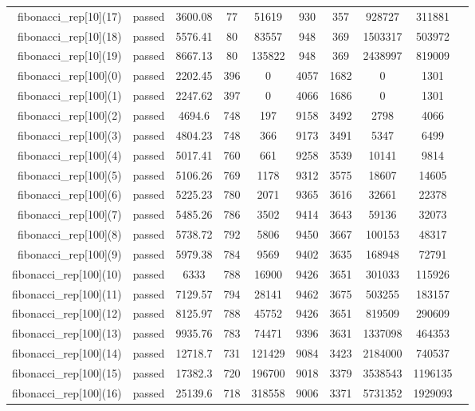\begin{longtable}{r|ccccccccc}
    fibonacci\_rep[10](17) & passed & 3600.08 & 77 & 51619 & 930 & 357 & 928727 & 311881 \\
    fibonacci\_rep[10](18) & passed & 5576.41 & 80 & 83557 & 948 & 369 & 1503317 & 503972 \\
    fibonacci\_rep[10](19) & passed & 8667.13 & 80 & 135822 & 948 & 369 & 2438997 & 819009 \\
    fibonacci\_rep[100](0) & passed & 2202.45 & 396 & 0 & 4057 & 1682 & 0 & 1301 \\
    fibonacci\_rep[100](1) & passed & 2247.62 & 397 & 0 & 4066 & 1686 & 0 & 1301 \\
    fibonacci\_rep[100](2) & passed & 4694.6 & 748 & 197 & 9158 & 3492 & 2798 & 4066 \\
    fibonacci\_rep[100](3) & passed & 4804.23 & 748 & 366 & 9173 & 3491 & 5347 & 6499 \\
    fibonacci\_rep[100](4) & passed & 5017.41 & 760 & 661 & 9258 & 3539 & 10141 & 9814 \\
    fibonacci\_rep[100](5) & passed & 5106.26 & 769 & 1178 & 9312 & 3575 & 18607 & 14605 \\
    fibonacci\_rep[100](6) & passed & 5225.23 & 780 & 2071 & 9365 & 3616 & 32661 & 22378 \\
    fibonacci\_rep[100](7) & passed & 5485.26 & 786 & 3502 & 9414 & 3643 & 59136 & 32073 \\
    fibonacci\_rep[100](8) & passed & 5738.72 & 792 & 5806 & 9450 & 3667 & 100153 & 48317 \\
    fibonacci\_rep[100](9) & passed & 5979.38 & 784 & 9569 & 9402 & 3635 & 168948 & 72791 \\
    fibonacci\_rep[100](10) & passed & 6333 & 788 & 16900 & 9426 & 3651 & 301033 & 115926 \\
    fibonacci\_rep[100](11) & passed & 7129.57 & 794 & 28141 & 9462 & 3675 & 503255 & 183157 \\
    fibonacci\_rep[100](12) & passed & 8125.97 & 788 & 45752 & 9426 & 3651 & 819509 & 290609 \\
    fibonacci\_rep[100](13) & passed & 9935.76 & 783 & 74471 & 9396 & 3631 & 1337098 & 464353 \\
    fibonacci\_rep[100](14) & passed & 12718.7 & 731 & 121429 & 9084 & 3423 & 2184000 & 740537 \\
    fibonacci\_rep[100](15) & passed & 17382.3 & 720 & 196700 & 9018 & 3379 & 3538543 & 1196135 \\
    fibonacci\_rep[100](16) & passed & 25139.6 & 718 & 318558 & 9006 & 3371 & 5731352 & 1929093 \\

\end{longtable}
